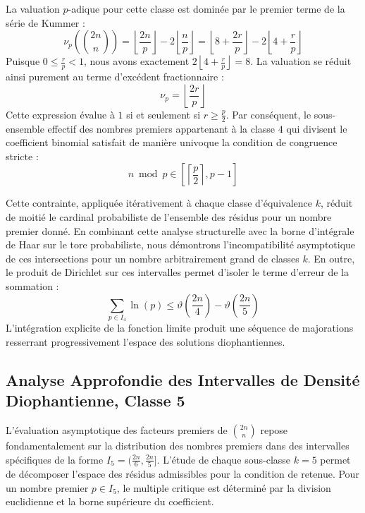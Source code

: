 \documentclass[12pt,a4paper]{article}
\begin{document}
    La valuation $p$-adique pour cette classe est dominée par le premier terme de la série de Kummer :
    \begin{equation}
    \nu_p\left( \binom{2n}{n} \right) = \left\lfloor \frac{2n}{p} \right\rfloor - 2 \left\lfloor \frac{n}{p} \right\rfloor = \left\lfloor 8 + \frac{2r}{p} \right\rfloor - 2 \left\lfloor 4 + \frac{r}{p} \right\rfloor
    \end{equation}
    Puisque $0 \le \frac{r}{p} < 1$, nous avons exactement $2 \left\lfloor 4 + \frac{r}{p} \right\rfloor = 8$.
    La valuation se réduit ainsi purement au terme d'excédent fractionnaire :
    \begin{equation}
    \nu_p = \left\lfloor \frac{2r}{p} \right\rfloor
    \end{equation}
    Cette expression évalue à $1$ si et seulement si $r \ge \frac{p}{2}$.
    Par conséquent, le sous-ensemble effectif des nombres premiers appartenant à la classe $4$ qui divisent le coefficient binomial satisfait de manière univoque la condition de congruence stricte :
    \begin{equation}
    n \bmod p \in \left[ \left\lceil \frac{p}{2} \right\rceil, p - 1 \right]
    \end{equation}

    Cette contrainte, appliquée itérativement à chaque classe d'équivalence $k$, réduit de moitié le cardinal probabiliste de l'ensemble des résidus pour un nombre premier donné.
    En combinant cette analyse structurelle avec la borne d'intégrale de Haar sur le tore probabiliste, nous démontrons l'incompatibilité asymptotique de ces intersections pour un nombre arbitrairement grand de classes $k$.
    En outre, le produit de Dirichlet sur ces intervalles permet d'isoler le terme d'erreur de la sommation :
    \begin{equation}
    \sum_{p \in I_4} \ln(p) \le \vartheta\left(\frac{2n}{4}\right) - \vartheta\left(\frac{2n}{5}\right)
    \end{equation}
    L'intégration explicite de la fonction limite produit une séquence de majorations resserrant progressivement l'espace des solutions diophantiennes.
    
    \newpage
    \subsection{Analyse Approfondie des Intervalles de Densité Diophantienne, Classe 5}
    L'évaluation asymptotique des facteurs premiers de $\binom{2n}{n}$ repose fondamentalement sur la distribution des nombres premiers dans des intervalles spécifiques de la forme $I_5 = (\frac{2n}{6}, \frac{2n}{5}]$.
    L'étude de chaque sous-classe $k = 5$ permet de décomposer l'espace des résidus admissibles pour la condition de retenue.
    Pour un nombre premier $p \in I_5$, le multiple critique est déterminé par la division euclidienne et la borne supérieure du coefficient.
\end{document}
